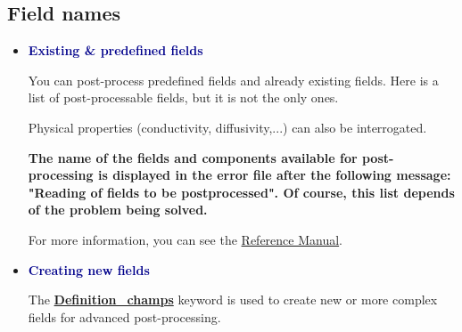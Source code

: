 \subsection{Field names}
\begin{itemize}
\item \textcolor{darkblue}{\textbf{Existing \& predefined fields}}

You can post-process predefined fields and already existing fields.
Here is a list of post-processable fields, but it is not the only ones.

\small

\normalsize

\begin{remark}
Physical properties (conductivity, diffusivity,...) can also be interrogated.
\end{remark}


\textbf{The name of the fields and components available for post-processing is displayed in the error file after the following message: "Reading of fields to be postprocessed". Of course, this list depends of the problem being solved.}

For more information, you can see the \href{\REFERENCEMANUAL\#champsapost}{\trustref Reference Manual}.

\item \textcolor{darkblue}{\textbf{Creating new fields}}

The \href{\REFERENCEMANUAL\#definitionchamps}{\textbf{Definition\_champs}} keyword is used to create new or more complex fields for advanced post-processing.

\begin{center}
\end{center}





\end{itemize}
